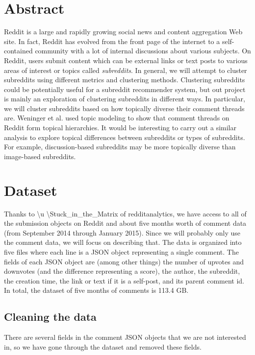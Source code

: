 \documentclass[letterpaper]{article}
\numberwithin{equation}{subsection}
\begin{document}
\maketitle

\section{Abstract}
Reddit is a large and rapidly growing social news and content aggregation Web site. In fact, Reddit has evolved from the front page of the internet to a self-contained community with a lot of internal discussions about various subjects\cite{Singer}. On Reddit, users submit content which can be external links or text posts to various areas of interest or topics called \emph{subreddits}. In general, we will attempt to cluster subreddits using different metrics and clustering methods. Clustering subreddits could be potentially useful for a subreddit recommender system, but out project is mainly an exploration of clustering subreddits in different ways. In particular, we will cluster subreddits based on how topically diverse their comment threads are. Weninger et al.\cite{weninger} used topic modeling to show that comment threads on Reddit form topical hierarchies. It would be interesting to carry out a similar analysis to explore topical differences between subreddits or types of subreddits. For example, discussion-based subreddits may be more topically diverse than image-based subreddits.

\section{Dataset}
Thanks to \textbackslash u \textbackslash Stuck\_in\_the\_Matrix of redditanalytics, we have access to all of the submission objects on Reddit and about five months worth of comment data (from September 2014 through January 2015). Since we will probably only use the comment data, we will focus on describing that. The data is organized into five files where each line is a JSON object representing a single comment. The fields of each JSON object are (among other things) the number of upvotes and downvotes (and the difference representing a score), the author, the subreddit, the creation time, the link or text if it is a self-post, and its parent comment id. In total, the dataset of five months of comments is 113.4 GB.

\subsection{Cleaning the data}
There are several fields in the comment JSON objects that we are not interested in, so we have gone through the dataset and removed these fields.
\end{document}

